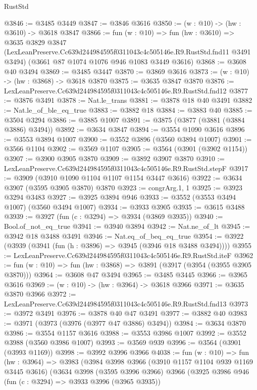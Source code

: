 \begin{lexlean}{RustStd}
\begin{coremodule}
@3846 := @3485 @3449
@3847 := @3846 @3616
@3850 := (w : @10) -> (hw : @3610) -> @3618 @3847
@3866 := fun (w : @10) =>
  fun (hw : @3610) =>
  @3635
    @3829
    @3847
    (LexLeanPreserve.Cc639d244984595f0311043c4c505146e.R9.RustStd.fnd11 @3491 @3494)
    (@3661 @87 @1074 @1076 @946 @1083 @3449 @3616)
@3868 := @3608 @40 @3494
@3869 := @3485 @3447
@3870 := @3869 @3616
@3873 := (w : @10) -> (hw : @3868) -> @3618 @3870
@3875 := @3635 @3847 @3870
@3876 := LexLeanPreserve.Cc639d244984595f0311043c4c505146e.R9.RustStd.fnd12
@3877 := @3876 @3491
@3878 := Nat.le_trans
@3881 := @3878 @18 @40 @3491
@3882 := Nat.le_of_ble_eq_true
@3883 := @3882 @18
@3884 := @3883 @40
@3885 := @3504 @3294
@3886 := @3885 @1007
@3891 := @3875 (@3877 (@3881 (@3884 @3886) @3494))
@3892 := @3634 @3847
@3894 := @3554 @1090 @3616
@3896 := @3553 @3894 @1007
@3900 := @3552 @3896 (@3560 @3894 @1007)
@3901 := @3566 @1104
@3902 := @3569 @1107
@3905 := @3564 (@3901 (@3902 @1154))
@3907 := @3900 @3905 @3870
@3909 := @3892 @3907 @3870
@3910 := LexLeanPreserve.Cc639d244984595f0311043c4c505146e.R9.RustStd.stepF
@3917 := @3909 (@3910 @1090 @1104 @1107 @1154 @3447 @3616)
@3922 := @3634 @3907 (@3595 @3905 @3870) @3870
@3923 := congrArg.{1, 1}
@3925 := @3923 @3294 @3483
@3927 := @3925 @3894 @946
@3933 := @3552 (@3553 @3494 @1007) (@3560 @3494 @1007)
@3934 := @3933 @3905
@3935 := @3615 @3488
@3939 := @3927 (fun (c : @3294) => @3934 (@3869 @3935))
@3940 := Bool.of_not_eq_true
@3941 := @3940 @3894
@3942 := Nat.ne_of_lt
@3945 := @3942 @18 @3488 @3491
@3946 := Nat.eq_of_beq_eq_true
@3954 := @3922 (@3939 (@3941 (fun (h : @3896) => @3945 (@3946 @18 @3488 @3494))))
@3955 := LexLeanPreserve.Cc639d244984595f0311043c4c505146e.R9.RustStd.iteF
@3962 := fun (w : @10) => fun (hw : @3868) => @3891 (@3917 (@3954 (@3955 @3905 @3870)))
@3964 := @3608 @47 @3494
@3965 := @3485 @3445
@3966 := @3965 @3616
@3969 := (w : @10) -> (hw : @3964) -> @3618 @3966
@3971 := @3635 @3870 @3966
@3972 := LexLeanPreserve.Cc639d244984595f0311043c4c505146e.R9.RustStd.fnd13
@3973 := @3972 @3491
@3976 := @3878 @40 @47 @3491
@3977 := @3882 @40
@3983 := @3971 (@3973 (@3976 (@3977 @47 @3886) @3494))
@3984 := @3634 @3870
@3986 := @3554 @1157 @3616
@3988 := @3553 @3986 @1007
@3992 := @3552 @3988 (@3560 @3986 @1007)
@3993 := @3569 @939
@3996 := @3564 (@3901 (@3993 @1169))
@3998 := @3992 @3996 @3966
@4038 := fun (w : @10) =>
  fun (hw : @3964) =>
  @3983
    (@3984
      @3998
      @3966
      (@3910 @1157 @1104 @939 @1169 @3445 @3616)
      (@3634
        @3998
        (@3595 @3996 @3966)
        @3966
        (@3925
          @3986
          @946
          (fun (c : @3294) => @3933 @3996 (@3965 @3935))

\end{coremodule}
\end{lexlean}
